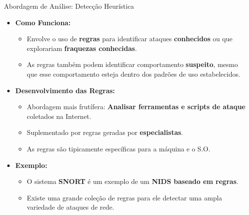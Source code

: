 \begin{frame}{Abordagem de Análise: Detecção Heurística}
    \begin{itemize}
        \item \textbf{Como Funciona:}
              \begin{itemize}
                  \item Envolve o uso de \textbf{regras} para identificar ataques \textbf{conhecidos} ou que explorariam \textbf{fraquezas conhecidas}.

                  \item As regras também podem identificar comportamento \textbf{suspeito}, mesmo que esse comportamento esteja dentro dos padrões de uso estabelecidos.
              \end{itemize}

        \item \textbf{Desenvolvimento das Regras:}
              \begin{itemize}
                  \item Abordagem mais frutífera: \textbf{Analisar ferramentas e scripts de ataque} coletados na Internet.
                  \item Suplementado por regras geradas por \textbf{especialistas}.
                  \item As regras são tipicamente específicas para a máquina e o S.O.
              \end{itemize}

        \item \textbf{Exemplo:}
              \begin{itemize}
                  \item O sistema \textbf{SNORT} é um exemplo de um \textbf{NIDS baseado em regras}.
                  \item Existe uma grande coleção de regras para ele detectar uma ampla variedade de ataques de rede.
              \end{itemize}
    \end{itemize}
\end{frame}


